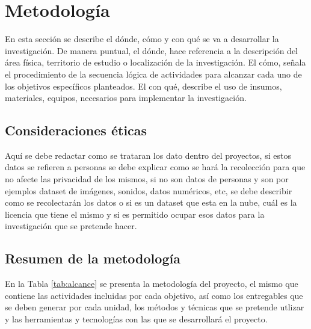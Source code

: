 

\clearpage
\section{Metodología}
En esta sección se describe el dónde, cómo y con qué se va a desarrollar la investigación. De manera puntual, el dónde, hace referencia a la descripción del área física, territorio de estudio o localización de la investigación. El cómo, señala el procedimiento de la secuencia lógica de actividades para alcanzar cada uno de los objetivos específicos planteados. El con qué, describe el uso de insumos, materiales, equipos, necesarios para implementar la investigación. 
\subsection{Consideraciones éticas}
Aquí se debe redactar como se trataran los dato dentro del proyectos, si estos datos se refieren a personas se debe explicar como se hará la recolección para que no afecte las privacidad de los mismos, si no son datos de personas y son por ejemplos dataset de imágenes, sonidos, datos numéricos, etc, se debe describir como se recolectarán los datos o si es un dataset que esta en la nube, cuál es la licencia que tiene el mismo y si es permitido ocupar esos datos para la investigación que se pretende hacer.

\subsection{Resumen de la metodología}
En la Tabla \ref{tab:alcance} se presenta la metodología del proyecto, el mismo que contiene las actividades incluidas por cada objetivo, así como los entregables que se deben generar por cada unidad, los métodos y técnicas que se pretende utlizar y las herramientas y tecnologías con las que se desarrollará el proyecto.

